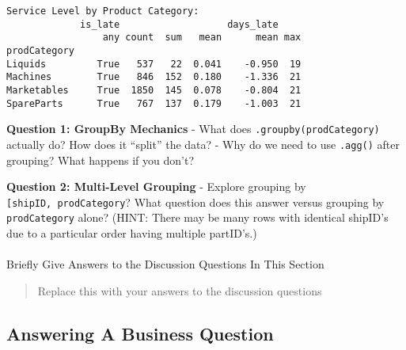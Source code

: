 \documentclass[
  letterpaper,
  DIV=11,
  numbers=noendperiod]{scrartcl}
\makeatletter
\let\oldparagraph\paragraph
\renewcommand{\paragraph}{
    \@ifstar
      \xxxParagraphStar
      \xxxParagraphNoStar
  }
\newcommand{\xxxParagraphStar}[1]{\oldparagraph*{#1}\mbox{}}
\newcommand{\xxxParagraphNoStar}[1]{\oldparagraph{#1}\mbox{}}
\makeatother
\begin{document}
\begin{verbatim}
Service Level by Product Category:
             is_late                   days_late    
                 any count  sum   mean      mean max
prodCategory                                        
Liquids         True   537   22  0.041    -0.950  19
Machines        True   846  152  0.180    -1.336  21
Marketables     True  1850  145  0.078    -0.804  21
SpareParts      True   767  137  0.179    -1.003  21
\end{verbatim}

\begin{tcolorbox}[enhanced jigsaw, colframe=quarto-callout-important-color-frame, title=\textcolor{quarto-callout-important-color}{\faExclamation}\hspace{0.5em}{🤔 Discussion Questions: Split-Apply-Combine Mental Model}, breakable, opacityback=0, arc=.35mm, leftrule=.75mm, titlerule=0mm, left=2mm, toptitle=1mm, rightrule=.15mm, bottomtitle=1mm, bottomrule=.15mm, opacitybacktitle=0.6, toprule=.15mm, colback=white, coltitle=black, colbacktitle=quarto-callout-important-color!10!white]

\textbf{Question 1: GroupBy Mechanics} - What does
\texttt{.groupby(\textquotesingle{}prodCategory\textquotesingle{})}
actually do? How does it ``split'' the data? - Why do we need to use
\texttt{.agg()} after grouping? What happens if you don't?

\textbf{Question 2: Multi-Level Grouping} - Explore grouping by
\texttt{{[}\textquotesingle{}shipID\textquotesingle{},\ \textquotesingle{}prodCategory\textquotesingle{}{]}}?
What question does this answer versus grouping by
\texttt{\textquotesingle{}prodCategory\textquotesingle{}} alone? (HINT:
There may be many rows with identical shipID's due to a particular order
having multiple partID's.)

\end{tcolorbox}

\paragraph{Briefly Give Answers to the Discussion Questions In This
Section}\label{briefly-give-answers-to-the-discussion-questions-in-this-section-6}

\begin{quote}
Replace this with your answers to the discussion questions
\end{quote}

\subsection{Answering A Business
Question}\label{answering-a-business-question}
\end{document}
